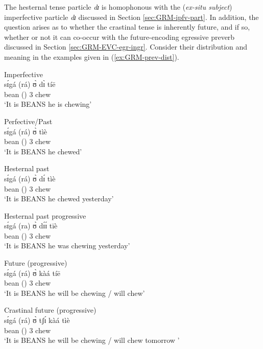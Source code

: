 \begin{exe}
\begin{exe}
\begin{exe}
{\begin{exe}
\begin{exe}
\begin{exe}
\begin{exe}
\begin{exe}
\begin{exe}
\begin{exe}
\begin{xlist}
\begin{exe}
\begin{exe}
\begin{exe}
\begin{exe}
\begin{exe}
\begin{exe}
\begin{exe}
\begin{exe}
\begin{exe}
\begin{exe}
\begin{exe}
\begin{exe}
\begin{exe}
\begin{exe}
The hesternal tense particle {\it dɪ} is homophonous with the ({\it ex-situ
subject}) imperfective particle  {\it dɪ} discussed in Section
\ref{sec:GRM-ipfv-part}.  In addition, the question arises as to whether the
crastinal tense  is inherently future, and if so, whether or not it can
co-occur with the future-encoding egressive preverb discussed in Section
\ref{sec:GRM-EVC-egr-ingr}. Consider their distribution and meaning in the
examples given in (\ref{ex:GRM-prev-dist}).


\ea\label{ex:GRM-prev-dist}

\ea\label{ex:GRM-prev-dist-chew-presprog}{\rm Imperfective}\\
\gll  sɪ́gá (rá)  ʊ̀ dɪ̀  tíē   \\
 bean  ({\foc}) {3\sg} {\ipfv} chew\\
\glt `It is BEANS he is chewing'

 \ex\label{ex:GRM-prev-dist-chew-past}{\rm Perfective/Past}\\
\gll  sɪ́gá (rá) ʊ̀   tìè     \\
 bean  ({\foc}) {3\sg}  chew \\
\glt `It is BEANS he chewed'


 \ex\label{ex:GRM-prev-dist-chew-past}{\rm Hesternal past}\\
\gll  sɪ́gá (rá) ʊ̀ dɪ́    tìè     \\
 bean  ({\foc}) {3\sg} {\hest}  chew \\
\glt `It is BEANS he chewed yesterday'


 \ex\label{ex:GRM-prev-dist-chew-past-pro}{\rm Hesternal past progressive}\\
\gll  sɪ́gá (ra) ʊ̀ dɪ́ɪ́    tīè     \\
 bean  ({\foc}) {3\sg} {\hest}  chew \\
\glt `It is BEANS he was chewing yesterday'

 \ex\label{ex:GRM-prev-dist-chew-futprog}{\rm Future (progressive)}\\
\gll  sɪ́gá (rá) ʊ̀  kàá   tíē     \\
 bean  ({\foc}) {3\sg} {\fut}  chew \\
\glt `It is BEANS he will be chewing / will chew'

 \ex\label{ex:GRM-foc-top-chew-crasfutprog}{\rm Crastinal future 
(progressive)}\\
\gll  sɪ́gá (rá) ʊ̀ tʃɪ́  kàá   tìè     \\
 bean  ({\foc}) {3\sg} {\cras} {\fut}   chew \\
\glt `It is BEANS he will be chewing / will chew tomorrow '



\end{exe}
\end{exe}
\end{exe}
\end{exe}
\end{exe}
\end{exe}
\end{exe}
\end{exe}
\end{exe}
\end{exe}
\end{exe}
\end{exe}
\end{exe}
\end{exe}
\end{xlist}
\end{exe}
\end{exe}
\end{exe}
\end{exe}
\end{exe}
\end{exe}
\end{exe}}
\end{exe}
\end{exe}
\end{exe}
